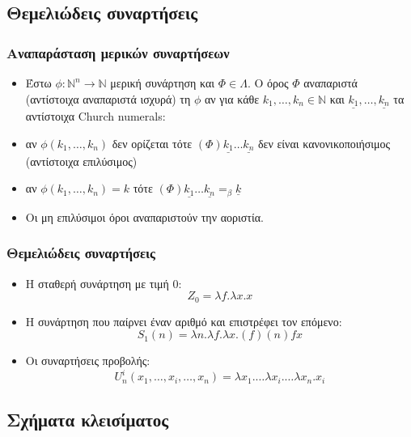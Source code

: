 \documentclass{beamer}
\begin{document}
\subsection{Θεμελιώδεις συναρτήσεις}
\begin{frame}
        \frametitle{Αναπαράσταση μερικών συναρτήσεων}
        \begin{itemize}
                \item Έστω $\phi : \mathbb{N}^n \rightarrow \mathbb{N}$ μερική συνάρτηση και $\Phi \in \Lambda $. O όρος $\Phi$ αναπαριστά (αντίστοιχα αναπαριστά ισχυρά) τη $\phi$ αν για κάθε $k_1,\ldots, k_n \in \mathbb{N}$ και $ \underline{k_1}, \ldots, \underline{k_n}$ τα αντίστοιχα Church numerals: \pause
                \item  αν $\phi(k_1,\ldots,k_n)$ δεν ορίζεται τότε $(\Phi) \underline{k_1} \ldots \underline{k_n}$ δεν είναι κανονικοποιήσιμος (αντίστοιχα επιλύσιμος) \pause
                \item  αν $\phi(k_1,\ldots,k_n) = k$ τότε $(\Phi) \underline{k_1} \ldots \underline{k_n} =_\beta \underline{k}$ 
                \pause
                \item Οι μη επιλύσιμοι όροι αναπαριστούν την αοριστία.
               
        \end{itemize}
\end{frame}




\begin{frame}
        \frametitle{Θεμελιώδεις συναρτήσεις}
        \begin{itemize}
                \item Η σταθερή συνάρτηση με τιμή 0:
                	$$Z_0=\lambda f . \lambda x . x$$
                \pause
                \item Η συνάρτηση που παίρνει έναν αριθμό και επιστρέφει τον επόμενο:
                	$$S_1(n)=\lambda n . \lambda f . \lambda x . (f) (n) f x$$
                \pause
                \item Οι συναρτήσεις προβολής: $$U^i_n(x_1,\ldots,x_i,\ldots,x_n)= \lambda x_1 . \ldots \lambda x_i . \ldots \lambda x_n . x_i$$
        \end{itemize}
\end{frame}
\subsection{Σχήματα κλεισίματος}
\end{document}
